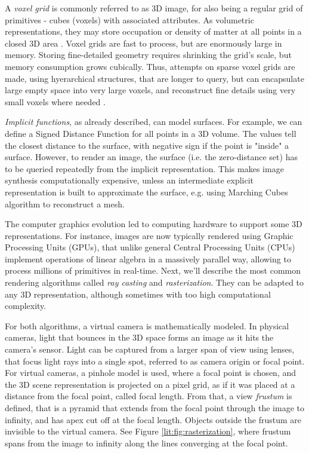 A \textit{voxel grid} is commonly referred to as 3D image, for also being a regular grid of primitives - cubes (voxels) with associated attributes. As volumetric representations, they may store occupation or density of matter at all points in a closed 3D area \cite{aux:voxels98}. Voxel grids are fast to process, but are enormously large in memory. Storing fine-detailed geometry requires shrinking the grid's scale, but memory consumption grows cubically. Thus, attempts on sparse voxel grids are made, using hyerarchical structures, that are longer to query, but can encapsulate large empty space into very large voxels, and reconstruct fine details using very small voxels where needed \cite{aux:voxels-sparse13}.

\textit{Implicit functions}, as already described, can model surfaces. For example, we can define a Signed Distance Function for all points in a 3D volume. The values tell the closest distance to the surface, with negative sign if the point is "inside" a surface. However, to render an image, the surface (i.e. the zero-distance set) has to be queried repeatedly from the implicit representation. This makes image synthesis computationally expensive, unless an intermediate explicit representation is built to approximate the surface, e.g. using Marching Cubes algorithm \cite{aux:marching-cubes87} to reconstruct a mesh.

The computer graphics evolution led to computing hardware to support some 3D representations. For instance, images are now typically rendered using Graphic Processing Units (GPUs), that unlike general Central Processing Units (CPUs) implement operations of linear algebra in a massively parallel way, allowing to process millions of primitives in real-time. Next, we'll describe the most common rendering algorithms called \textit{ray casting} and \textit{rasterization}. They can be adapted to any 3D representation, although sometimes with too high computational complexity.

For both algorithms, a virtual camera is mathematically modeled. In physical cameras, light that bounces in the 3D space forms an image as it hits the camera's sensor. Light can be captured from a larger span of view using lenses, that focus light rays into a single spot, referred to as camera origin or focal point. For virtual cameras, a pinhole model is used, where a focal point is chosen, and the 3D scene representation is projected on a pixel grid, as if it was placed at a distance from the focal point, called focal length. From that, a view \textit{frustum} is defined, that is a pyramid that extends from the focal point through the image to infinity, and has apex cut off at the focal length. Objects outside the frustum are invisible to the virtual camera. See Figure \ref{lit:fig:rasterization}, where frustum spans from the image to infinity along the lines converging at the focal point.

